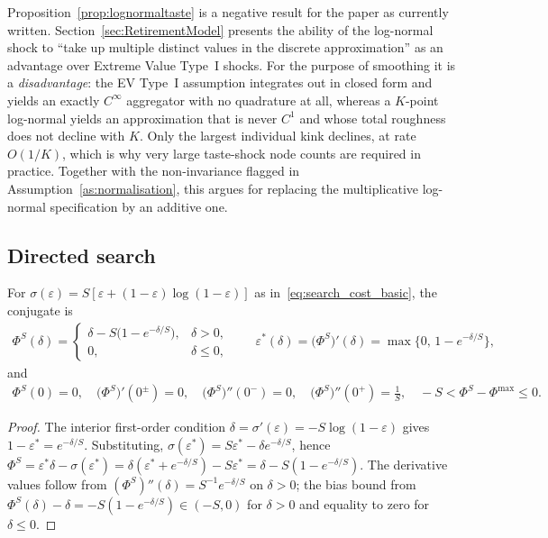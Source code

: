 Proposition~\ref{prop:lognormaltaste} is a negative result for the paper as currently
written. Section~\ref{sec:RetirementModel} presents the ability of the log-normal shock
to ``take up multiple distinct values in the discrete approximation'' as an advantage
over Extreme Value Type~I shocks. For the purpose of smoothing it is a
\emph{disadvantage}: the EV Type~I assumption integrates out in closed form and yields
an exactly $C^{\infty}$ aggregator with no quadrature at all, whereas a $K$-point
log-normal yields an approximation that is never $C^{1}$ and whose total roughness does
not decline with $K$. Only the largest individual kink declines, at rate $O(1/K)$,
which is why very large taste-shock node counts are required in practice. Together with
the non-invariance flagged in Assumption~\ref{as:normalisation}, this argues for
replacing the multiplicative log-normal specification by an additive one.

\subsection{Directed search}
\label{subsec:smooth_search}

\begin{lemma}
\label{lem:searchclosed}
For $\sigma(\varepsilon)=S[\varepsilon+(1-\varepsilon)\log(1-\varepsilon)]$ as
in~\eqref{eq:search_cost_basic}, the conjugate is
\begin{align}
\Phi^{S}(\delta)=
\begin{cases}
\delta - S\big(1-e^{-\delta/S}\big), & \delta>0,\\[2pt]
0, & \delta\le 0,
\end{cases}
\qquad
\varepsilon^{\ast}(\delta)=\big(\Phi^{S}\big)'(\delta)=\max\big\{0,\,1-e^{-\delta/S}\big\},
\label{eq:PhiS}
\end{align}
and
\begin{align}
\Phi^{S}(0)=0,\quad
\big(\Phi^{S}\big)'(0^{\pm})=0,\quad
\big(\Phi^{S}\big)''(0^{-})=0,\quad
\big(\Phi^{S}\big)''(0^{+})=\frac{1}{S},\quad
-S<\Phi^{S}-\Phi^{\max}\le 0 .
\end{align}
\end{lemma}

\begin{proof}
The interior first-order condition $\delta=\sigma'(\varepsilon)=-S\log(1-\varepsilon)$
gives $1-\varepsilon^{\ast}=e^{-\delta/S}$. Substituting,
$\sigma(\varepsilon^{\ast})=S\varepsilon^{\ast}-\delta e^{-\delta/S}$, hence
$\Phi^{S}=\varepsilon^{\ast}\delta-\sigma(\varepsilon^{\ast})
=\delta(\varepsilon^{\ast}+e^{-\delta/S})-S\varepsilon^{\ast}=\delta-S(1-e^{-\delta/S})$.
The derivative values follow from $(\Phi^{S})''(\delta)=S^{-1}e^{-\delta/S}$ on
$\delta>0$; the bias bound from $\Phi^{S}(\delta)-\delta=-S(1-e^{-\delta/S})\in(-S,0)$
for $\delta>0$ and equality to zero for $\delta\le0$.
\end{proof}


